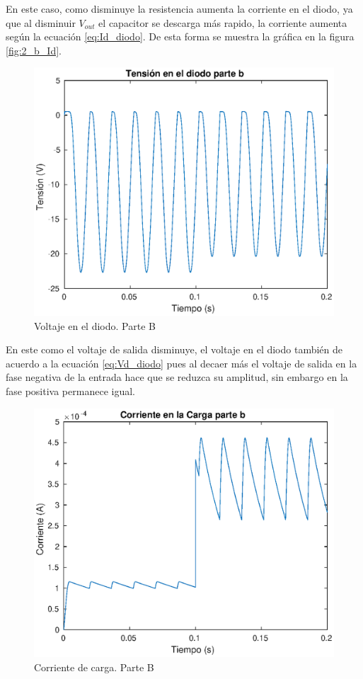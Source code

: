 \documentclass[12pt,letterpaper]{article}
\begin{document}
En este caso, como disminuye la resistencia aumenta la corriente en el diodo, ya que al disminuir $V_{out}$ el capacitor se descarga más rapido, la corriente aumenta según la ecuación \eqref{eq:Id_diodo}. De esta forma se muestra la gráfica en la figura \ref{fig:2_b_Id}.

\begin{figure}[ht!]
  \centering
  \includegraphics[width=0.8\linewidth]{pictures/Ejercicio2_b_Vd.eps}
  \caption{Voltaje en el diodo. Parte B}
  \label{fig:2_b_Vd}
\end{figure}

En este como el voltaje de salida disminuye, el voltaje en el diodo también de acuerdo a la ecuación \eqref{eq:Vd_diodo} pues al decaer más el voltaje de salida en la fase negativa de la entrada hace que se reduzca su amplitud, sin embargo en la fase positiva permanece igual.

\begin{figure}[ht!]
  \centering
  \includegraphics[width=0.8\linewidth]{pictures/Ejercicio2_b_carga.eps}
  \caption{Corriente de carga. Parte B}
  \label{fig:2_b_carga}
\end{figure}
\end{document}
